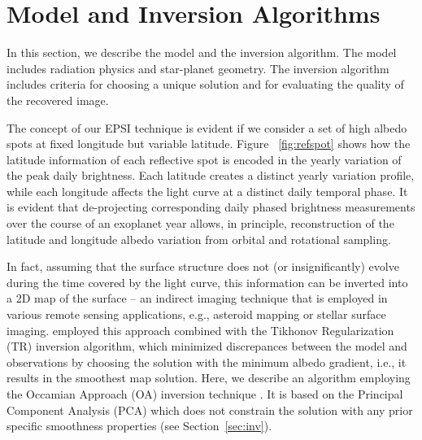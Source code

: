 \documentclass{emulateapj}
\begin{document}
\section{Model and Inversion Algorithms}\label{sec:mod}

In this section, we describe the model and the inversion algorithm.
The model includes radiation physics and star-planet geometry. 
The inversion algorithm includes criteria for choosing a unique solution
and for evaluating the quality of the recovered image.  

The concept of our EPSI technique is evident if we consider a set of high albedo spots at fixed 
longitude but variable latitude. Figure ~\ref{fig:refspot} shows how the latitude information 
of each reflective spot is encoded in the yearly variation of the peak daily  brightness. 
Each latitude creates a distinct yearly variation profile, while each longitude affects 
the light curve at a distinct daily temporal phase. 
It is evident that de-projecting corresponding daily phased brightness measurements over the course 
of an exoplanet year allows, in principle, reconstruction of the latitude and longitude albedo variation
from orbital and rotational sampling.

In fact, assuming that the surface structure 
does not (or insignificantly) evolve during the time covered by the light curve, 
this information can be inverted into a 2D map of the surface -- 
an indirect imaging technique that is employed in various remote sensing applications,
e.g., asteroid mapping or stellar surface imaging. 
\cite{fk12} employed this approach combined with the Tikhonov
Regularization (TR) inversion algorithm, which minimized discrepances between the model 
and observations by choosing the solution with the minimum albedo gradient, i.e., it
results in the smoothest map solution. 
Here, we describe an algorithm employing the Occamian Approach (OA) inversion technique
\citep{berd1998}. It is based on the Principal Component Analysis (PCA) 
which does not constrain the solution with any prior specific smoothness properties 
(see Section~\ref{sec:inv}). 
\end{document}

